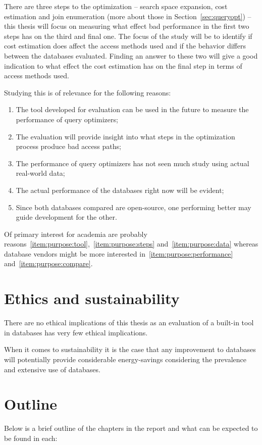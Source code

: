 There are three steps to the optimization – search space expansion, cost
estimation and join enumeration (more about those in Section~\ref{sec:queryopt})
– this thesis will focus on measuring what effect bad performance in the first
two steps has on the third and final one. The focus of the study will be to
identify if cost estimation does affect the access methods used and if the
behavior differs between the databases evaluated. Finding an answer to these two
will give a good indication to what effect the cost estimation has on the final
step in terms of access methods used.

Studying this is of relevance for the following reasons:
\begin{enumerate}
\item\label{item:purpose:tool} The tool developed for evaluation can be used
  in the future to measure the performance of query optimizers;
\item\label{item:purpose:steps} The evaluation will provide insight into
  what steps in the optimization process produce bad access paths;
\item\label{item:purpose:data} The performance of query optimizers has not
  seen much study using actual real-world data;
\item\label{item:purpose:performance} The actual performance of the
  databases right now will be evident;
\item\label{item:purpose:compare} Since both databases compared are
  open-source, one performing better may guide development for the other.
\end{enumerate}

Of primary interest for academia are probably
reasons~\ref{item:purpose:tool},~\ref{item:purpose:steps}
and~\ref{item:purpose:data} whereas database vendors might be more interested
in~\ref{item:purpose:performance} and~\ref{item:purpose:compare}.

\section{Ethics and sustainability}
There are no ethical implications of this thesis as an evaluation of a built-in
tool in databases has very few ethical implications.

When it comes to sustainability it is the case that any improvement to databases
will potentially provide considerable energy-savings considering the prevalence
and extensive use of databases.

\section{Outline}
Below is a brief outline of the chapters in the report and what can be expected
to be found in each:

